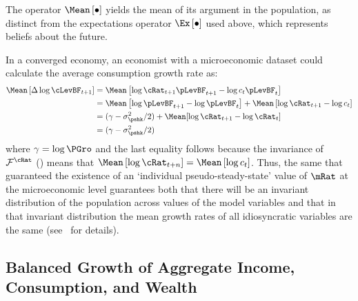 \documentclass[BufferStockTheory]{subfiles}
\begin{document}
The operator $\Mean\left[\bullet\right]$ yields the mean of its argument in the population, as distinct from the expectations operator $\Ex\left[\bullet\right]$ used above, which represents beliefs about the future.

In a converged economy, an economist with a microeconomic dataset could calculate the average consumption growth rate as:
\begin{align*}
  \Mean\left[\Delta \log \cLevBF_{t+1}\right]  & = \Mean\left[ \log {\cRat}_{t+1}\pLevBF_{t+1} - \log c_{t}\pLevBF_{t}\right]  \notag \\
                                               & = \Mean\left[ \log \pLevBF_{t+1}- \log \pLevBF_{t}\right] + \Mean\left[ \log {\cRat}_{t+1} - \log c_{t}\right]  \notag \\
                                               & = (\gamma - \sigma^{2}_{\pshk}/2) + \Mean[\log \cRat_{t+1} - \log \cRat_{t}] \\
                                               & = (\gamma - \sigma^{2}_{\pshk}/2)
\end{align*}
where $\gamma=\log \PGro$ and the last equality follows because the invariance of
 $\mathcal{F}^{\cRat}$ (\cite{szeidlInvariant}) means that $\Mean\left[ \log
  {\cRat}_{t+n}\right] = \Mean\left[ \log
  c_{t}\right]$.  Thus, the same {\GIC} that guaranteed the existence of an `individual pseudo-steady-state' value of $\mRat$ at the microeconomic level guarantees both that there will be an invariant distribution of the population across values of the model variables and that in that invariant distribution the mean growth rates of all idiosyncratic variables are the same (see~\cite{szeidlInvariant} for details).

\hypertarget{Growth-Rates-of-Aggregate-Income-and-Consumption}{}
\subsection{Balanced Growth of Aggregate Income, Consumption, and Wealth}\label{subsec:cGroEqPGroQ}

\end{document}
